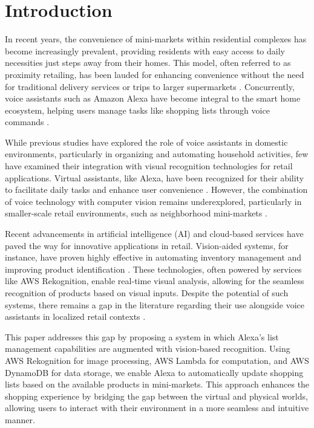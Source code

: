 \section{Introduction}

In recent years, the convenience of mini-markets within residential complexes has become increasingly prevalent, providing residents with easy access to daily necessities just steps away from their homes. This model, often referred to as proximity retailing, has been lauded for enhancing convenience without the need for traditional delivery services or trips to larger supermarkets \cite{smith2020}. Concurrently, voice assistants such as Amazon Alexa have become integral to the smart home ecosystem, helping users manage tasks like shopping lists through voice commands \cite{jones2019}.

While previous studies have explored the role of voice assistants in domestic environments, particularly in organizing and automating household activities, few have examined their integration with visual recognition technologies for retail applications. Virtual assistants, like Alexa, have been recognized for their ability to facilitate daily tasks and enhance user convenience \cite{doe2021}. However, the combination of voice technology with computer vision remains underexplored, particularly in smaller-scale retail environments, such as neighborhood mini-markets \cite{lee2020}.

Recent advancements in artificial intelligence (AI) and cloud-based services have paved the way for innovative applications in retail. Vision-aided systems, for instance, have proven highly effective in automating inventory management and improving product identification \cite{wang2022}. These technologies, often powered by services like AWS Rekognition, enable real-time visual analysis, allowing for the seamless recognition of products based on visual inputs. Despite the potential of such systems, there remains a gap in the literature regarding their use alongside voice assistants in localized retail contexts \cite{chen2023}.

This paper addresses this gap by proposing a system in which Alexa’s list management capabilities are augmented with vision-based recognition. Using AWS Rekognition for image processing, AWS Lambda for computation, and AWS DynamoDB for data storage, we enable Alexa to automatically update shopping lists based on the available products in mini-markets. This approach enhances the shopping experience by bridging the gap between the virtual and physical worlds, allowing users to interact with their environment in a more seamless and intuitive manner.

